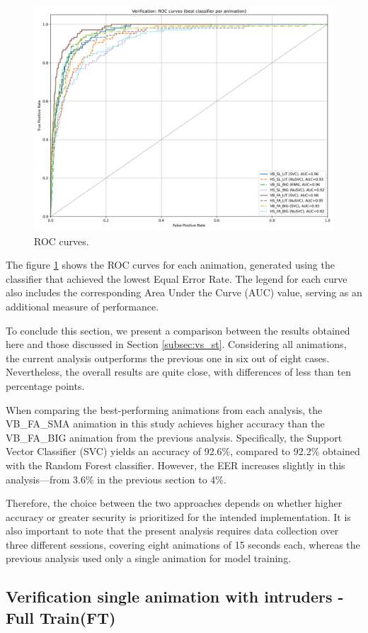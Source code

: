 \documentclass[12pt]{report}
\begin{document}
\begin{figure}[ht]
    \centering
    \includegraphics[width = 0.6
    \textwidth]{Images/Results/Verification_single/ft/best_animation_roc_curves_ft.png}
    \caption{ROC curves.}
    \label{fig:roc_ft}
\end{figure}

The figure \ref{fig:roc_ft} shows the ROC curves for each animation, generated using the classifier that achieved the lowest Equal Error Rate. 
The legend for each curve also includes the corresponding Area Under the Curve (AUC) value, serving as an additional measure of performance.

To conclude this section, we present a comparison between the results obtained here and those discussed in Section \ref{subsec:vs_st}. 
Considering all animations, the current analysis outperforms the previous one in six out of eight cases. 
Nevertheless, the overall results are quite close, with differences of less than ten percentage points.

When comparing the best-performing animations from each analysis, the VB\_FA\_SMA animation in this study achieves higher accuracy than the VB\_FA\_BIG animation from the previous analysis. 
Specifically, the Support Vector Classifier (SVC) yields an accuracy of 92.6\%, compared to 92.2\% obtained with the Random Forest classifier. 
However, the EER increases slightly in this analysis—from 3.6\% in the previous section to 4\%.

Therefore, the choice between the two approaches depends on whether higher accuracy or greater security is prioritized for the intended implementation. 
It is also important to note that the present analysis requires data collection over three different sessions, covering eight animations of 15 seconds each, whereas the previous analysis used only a single animation for model training.
\FloatBarrier

\subsection{Verification single animation with intruders - Full Train(FT)}
\label{subsec:intruders}
\end{document}
